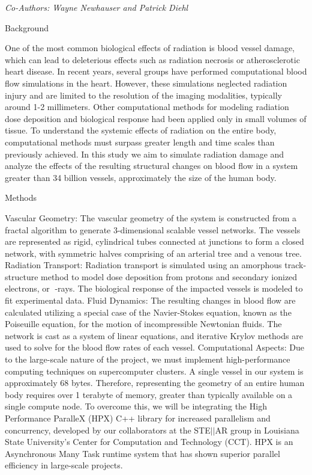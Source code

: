 \begin{center}
\textit{Co-Authors: Wayne	Newhauser and Patrick Diehl }
\end{center} 
\begin{center}
Background
\end{center}
One of the most common biological effects of radiation is blood vessel damage, which can lead to deleterious effects such as radiation necrosis or atherosclerotic heart disease. In recent years, several groups have performed computational blood flow simulations in the heart. However, these simulations neglected radiation injury and are limited to the resolution of the imaging modalities, typically around 1-2 millimeters. Other computational methods for modeling radiation dose deposition and biological response had been applied only in small volumes of tissue. To understand the systemic effects of radiation on the entire body, computational methods must surpass greater length and time scales than previously achieved. In this study we aim to simulate radiation damage and analyze the effects of the resulting structural changes on blood flow in a system greater than 34 billion vessels, approximately the size of the human body.

\begin{center}
Methods
\end{center}
Vascular Geometry: The vascular geometry of the system is constructed from a fractal algorithm to generate 3-dimensional scalable vessel networks. The vessels are represented as rigid, cylindrical tubes connected at junctions to form a closed network, with symmetric halves comprising of an arterial tree and a venous tree.
Radiation Transport: Radiation transport is simulated using an amorphous track-structure method to model dose deposition from protons and secondary ionized electrons, or -rays. The biological response of the impacted vessels is modeled to fit experimental data.
Fluid Dynamics: The resulting changes in blood flow are calculated utilizing a special case of the Navier-Stokes equation, known as the Poiseuille equation, for the motion of incompressible Newtonian fluids. The network is cast as a system of linear equations, and iterative Krylov methods are used to solve for the blood flow rates of each vessel.
Computational Aspects: Due to the large-scale nature of the project, we must implement high-performance computing techniques on supercomputer clusters. A single vessel in our system is approximately 68 bytes. Therefore, representing the geometry of an entire human body requires over 1 terabyte of memory, greater than typically available on a single compute node.
To overcome this, we will be integrating the High Performance ParalleX (HPX) C++ library for increased parallelism and concurrency, developed by our collaborators at the STE$\vert\vert$AR group in Louisiana State University’s Center for Computation and Technology (CCT). HPX is an Asynchronous Many Task runtime system that has shown superior parallel efficiency in large-scale projects.


